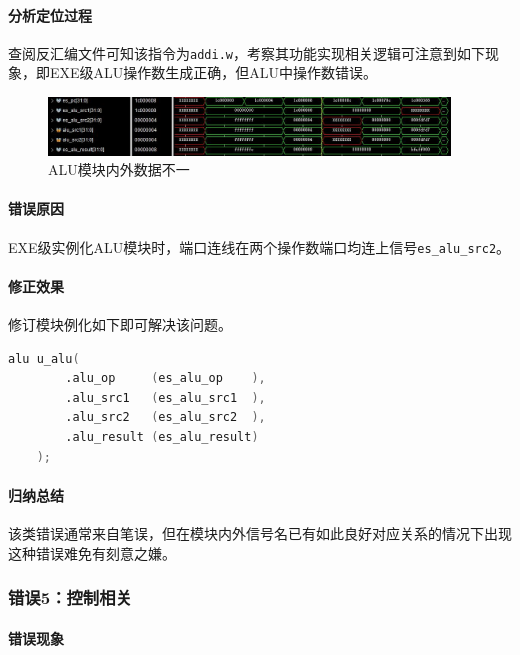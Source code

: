\documentclass[UTF-8,twoside,c5size]{ctexart}
\begin{document}
	\paragraph{分析定位过程}\hfill
	
	查阅反汇编文件可知该指令为\texttt{addi.w}，考察其功能实现相关逻辑可注意到如下现象，即EXE级ALU操作数生成正确，但ALU中操作数错误。
	\begin{figure}[!h]
		\centering
		\includegraphics*[width=0.95\textwidth]{03-dbg-04-01.jpg}
		\caption{ALU模块内外数据不一}
	\end{figure}

	\paragraph{错误原因}\hfill
	
	EXE级实例化ALU模块时，端口连线在两个操作数端口均连上信号\texttt{es\_alu\_src2}。
	
	\paragraph{修正效果}\hfill
	
	修订模块例化如下即可解决该问题。
	
	\begin{lstlisting}[language=verilog]
	alu u_alu(
		.alu_op     (es_alu_op    ),
		.alu_src1   (es_alu_src1  ),
		.alu_src2   (es_alu_src2  ),
		.alu_result (es_alu_result)
	);
	\end{lstlisting}

	\paragraph{归纳总结}\hfill
	
	该类错误通常来自笔误，但在模块内外信号名已有如此良好对应关系的情况下出现这种错误难免有刻意之嫌。
	
	\subsubsection{错误\textbf{5：}控制相关}
	
	\paragraph{错误现象}\hfill
	
\end{document}
